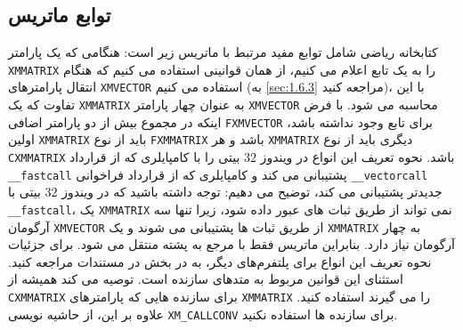 \subsection{\textbf{توابع ماتریس}}
{
    \Large
    \begin{spacing}{1.5}
        کتابخانه ریاضی  شامل توابع مفید مرتبط با ماتریس زیر است:
        \textbf{\vspace{6pt}}
        \lr{}
        \textbf{\vspace{6pt}}
        هنگامی که یک پارامتر \texttt{XMMATRIX} را به یک تابع اعلام می کنیم، از همان قوانینی استفاده می کنیم که هنگام انتقال پارامترهای \texttt{XMVECTOR} استفاده می کنیم
        (به \ref{sec:1.6.3} مراجعه کنید)،
        با این تفاوت که یک \texttt{XMMATRIX} به عنوان چهار پارامتر \texttt{XMVECTOR} محاسبه می شود.
        با فرض اینکه در مجموع بیش از دو پارامتر اضافی \texttt{FXMVECTOR} برای تابع وجود نداشته باشد،
        اولین \texttt{XMMATRIX} باید از نوع \texttt{FXMMATRIX} باشد و هر \texttt{XMMATRIX} دیگری باید از نوع \texttt{CXMMATRIX} باشد.
        نحوه تعریف این انواع در ویندوز $32$ بیتی را با کامپایلری که از قرارداد \texttt{\_\_fastcall} پشتیبانی می کند
        و کامپایلری که از قرارداد فراخوانی \texttt{\_\_vectorcall} جدیدتر پشتیبانی می کند، توضیح می دهیم:
        \textbf{\vspace{6pt}}
        \lr{}
        \textbf{\vspace{6pt}}
        توجه داشته باشید که در ویندوز $32$ بیتی با \texttt{\_\_fastcall}، یک \texttt{XMMATRIX} نمی تواند از طریق ثبات های  عبور داده شود،
        زیرا تنها سه آرگومان \texttt{XMVECTOR} از طریق ثبات ها پشتیبانی می شوند و یک \texttt{XMMATRIX} به چهار آرگومان نیاز دارد.
        بنابراین ماتریس فقط با مرجع به پشته منتقل می شود.
        برای جزئیات نحوه تعریف این انواع برای پلتفرم‌های دیگر، به  در بخش  در مستندات  مراجعه کنید.
        استثنای این قوانین مربوط به متدهای سازنده است.
        \lr{[DirectXMath]} توصیه می کند همیشه از \texttt{CXMMATRIX} برای سازنده هایی که پارامترهای \texttt{XMMATRIX} را می گیرند استفاده کنید.
        علاوه بر این، از حاشیه نویسی \texttt{XM\_CALLCONV} برای سازنده ها استفاده نکنید.
    \end{spacing}
}

